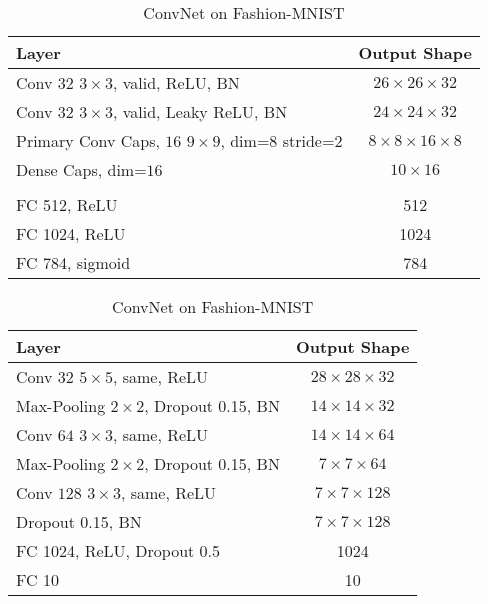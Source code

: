 \begin{table}
	\centering
	
	\begin{tabular}{lc}
		\toprule
		Layer	& Output Shape \\ 
		\midrule 
		Conv $32$ $3\times3$, valid, ReLU, BN	&  $26\times26\times32$ \\ 
		\midrule 
		Conv $32$ $3\times3$, valid, Leaky ReLU, BN	&  $24\times24\times32$\\ 
		\midrule 
		Primary Conv Caps, $16$ $9\times9$, dim=$8$	stride=$2$ &  $8\times8\times16\times8$\\ 
		\midrule 
		Dense Caps, dim=$16$	&  $10\times16$\\ 
		\midrule 
		& \\
		\midrule
		FC 512, ReLU	& 512 \\
		\midrule
		FC 1024, ReLU	& 1024 \\
		\midrule
		FC 784, sigmoid	& 784 \\
		\bottomrule
	\end{tabular}
	\caption{CapsNet on Fashion-MNIST}
	\label{tab:capsnet:fashion}
	
	\vspace{0.75cm}
	
	\begin{tabular}{lc}
		\toprule 
		Layer	&  Output Shape \\ 
		\midrule
		Conv $32$ $5\times5$, same,	ReLU & $28\times28\times32$ \\ 
		\midrule
		Max-Pooling $2\times2$, Dropout 0.15, BN	&  $14\times14\times32$ \\ 
		\midrule 
		Conv $64$ $3\times3$, same, ReLU	& $14\times14\times64$ \\ 
		\midrule 
		Max-Pooling $2\times2$, Dropout 0.15, BN	& $7\times7\times64$ \\
		\midrule
		Conv $128$ $3\times3$, same, ReLU	& $7\times7\times128$ \\
		\midrule
		Dropout 0.15, BN	& $7\times7\times128$ \\
		\midrule
		FC 1024, ReLU, Dropout 0.5 & 1024 \\
		\midrule
		FC 10 & 10\\
		\bottomrule
	\end{tabular} 
	\caption{ConvNet on Fashion-MNIST}
	\label{tab:convnet:fashion}
\end{table}


